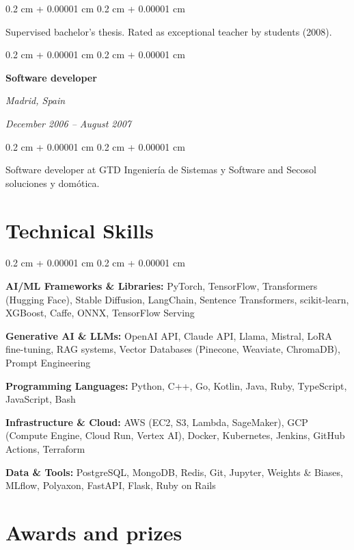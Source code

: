 \documentclass[10pt, letterpaper]{article}
\newenvironment{onecolentry}{
	\begin{adjustwidth}{
		0.2 cm + 0.00001 cm
	}{
		0.2 cm + 0.00001 cm
	}
	}{
	\end{adjustwidth}
} %
\newenvironment{twocolentry}[2][]{
	\onecolentry
	\def\secondColumn{#2}
	\setcolumnwidth{\fill, 5.5 cm}
	\begin{paracol}{2}
	}{
		\switchcolumn \raggedleft \secondColumn
	\end{paracol}
	\endonecolentry
} %
\begin{document}
	\vspace{0.10 cm}
	\begin{onecolentry}
		Supervised bachelor's thesis. Rated as exceptional teacher by students (2008).
	\end{onecolentry}

	\vspace{0.2 cm}

	\begin{twocolentry}{
		\textit{Madrid, Spain}
		
		\textit{December 2006 – August 2007}}
		\textbf{Software developer}
	\end{twocolentry}

	\vspace{0.10 cm}
	\begin{onecolentry}
		Software developer at GTD Ingeniería de Sistemas y Software and Secosol soluciones y domótica.
	\end{onecolentry}

	\vspace{0.3 cm}

	\section{Technical Skills}

	\begin{onecolentry}
		\textbf{AI/ML Frameworks \& Libraries:} PyTorch, TensorFlow, Transformers (Hugging Face), Stable Diffusion, LangChain, Sentence Transformers, scikit-learn, XGBoost, Caffe, ONNX, TensorFlow Serving
		
		\textbf{Generative AI \& LLMs:} OpenAI API, Claude API, Llama, Mistral, LoRA fine-tuning, RAG systems, Vector Databases (Pinecone, Weaviate, ChromaDB), Prompt Engineering
		
		\textbf{Programming Languages:} Python, C++, Go, Kotlin, Java, Ruby, TypeScript, JavaScript, Bash
		
		\textbf{Infrastructure \& Cloud:} AWS (EC2, S3, Lambda, SageMaker), GCP (Compute Engine, Cloud Run, Vertex AI), Docker, Kubernetes, Jenkins, GitHub Actions, Terraform
		
		\textbf{Data \& Tools:} PostgreSQL, MongoDB, Redis, Git, Jupyter, Weights \& Biases, MLflow, Polyaxon, FastAPI, Flask, Ruby on Rails
	\end{onecolentry}

	\vspace{0.3 cm}

	\section{Awards and prizes}
\end{document}
